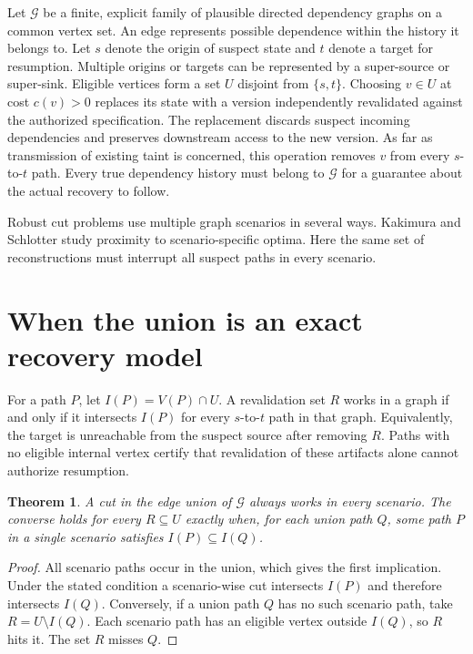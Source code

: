 \documentclass[11pt]{article}
\newtheorem{theorem}{Theorem}
\begin{document}
Let $\mathcal G$ be a finite, explicit family of plausible directed
dependency graphs on a common vertex set. An edge represents possible
dependence within the history it belongs to. Let $s$ denote the origin
of suspect state and $t$ denote a target for resumption. Multiple
origins or targets can be represented by a super-source or super-sink.
Eligible vertices form a set $U$ disjoint from $\{s,t\}$. Choosing
$v\in U$ at cost $c(v)>0$ replaces its state with a version independently
revalidated against the authorized specification. The replacement
discards suspect incoming dependencies and preserves downstream access
to the new version. As far as transmission of existing taint is
concerned, this operation removes $v$ from every $s$-to-$t$ path.
Every true dependency history must belong to $\mathcal G$ for a
guarantee about the actual recovery to follow.

Robust cut problems use multiple graph scenarios in several ways.
Kakimura and Schlotter \cite{kakimura} study proximity to
scenario-specific optima. Here the same set of reconstructions
must interrupt all suspect paths in every scenario.

\section{When the union is an exact recovery model}
For a path $P$, let $I(P)=V(P)\cap U$. A revalidation set $R$
works in a graph if and only if it intersects $I(P)$ for every
$s$-to-$t$ path in that graph. Equivalently, the target is unreachable
from the suspect source after removing $R$. Paths with no eligible
internal vertex certify that revalidation of these artifacts alone
cannot authorize resumption.

\begin{theorem}
A cut in the edge union of $\mathcal G$ always works in every
scenario. The converse holds for every $R\subseteq U$ exactly
when, for each union path $Q$, some path $P$ in a single scenario
satisfies $I(P)\subseteq I(Q)$.
\end{theorem}
\begin{proof}
All scenario paths occur in the union, which gives the first
implication. Under the stated condition a scenario-wise cut
intersects $I(P)$ and therefore intersects $I(Q)$.
Conversely, if a union path $Q$ has no such scenario path, take
$R=U\setminus I(Q)$. Each scenario path has an eligible vertex
outside $I(Q)$, so $R$ hits it. The set $R$ misses $Q$.
\end{proof}
\end{document}
